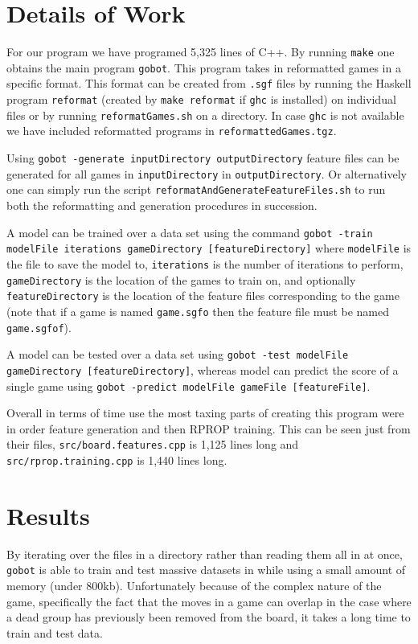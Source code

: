 \documentclass[11pt,letterpaper]{article}
\begin{document}
\section{Details of Work}

For our program we have programed 5,325 lines of C++. By running {\tt make} one obtains the main program
{\tt gobot}. This program takes in reformatted games in a specific format. This format can be created from {\tt *.sgf}
files by running the Haskell program {\tt reformat} (created by {\tt make reformat} if {\tt ghc} is installed) on individual
files or by running {\tt  reformatGames.sh} on a directory. In case {\tt ghc} is not available we have included
reformatted programs in {\tt reformattedGames.tgz}.

Using {\tt gobot -generate inputDirectory outputDirectory} feature files can be generated for all games in
{\tt inputDirectory} in {\tt outputDirectory}. Or alternatively one can simply run the script
{\tt reformatAndGenerateFeatureFiles.sh} to run both the reformatting and generation procedures in succession.

A model can be trained over a data set using the command
{\tt gobot -train modelFile iterations gameDirectory [featureDirectory]} where {\tt modelFile} is the file to save the
model to, {\tt iterations} is the number of iterations to perform, {\tt gameDirectory} is the location of the games to
train on, and optionally {\tt featureDirectory} is the location of the feature files corresponding to the game (note that
if a game is named {\tt game.sgfo} then the feature file must be named {\tt game.sgfof}).

A model can be tested over a data set using {\tt gobot -test modelFile gameDirectory [featureDirectory]}, whereas
model can predict the score of a single game using {\tt gobot -predict modelFile gameFile [featureFile]}.

Overall in terms of time use the most taxing parts of creating this program were in order feature generation and then
RPROP training. This can be seen just from their files, {\tt src/board.features.cpp} is 1,125 lines long and
{\tt src/rprop.training.cpp} is 1,440 lines long.

\section{Results}

By iterating over the files in a directory rather than reading them all in at once, {\tt gobot} is able to train and test
massive datasets in while using a small amount of memory (under 800kb). Unfortunately because of the complex
nature of the game, specifically the fact that the moves in a game can overlap in the case where a dead group has
previously been removed from the board, it takes a long time to train and test data.
\end{document}
